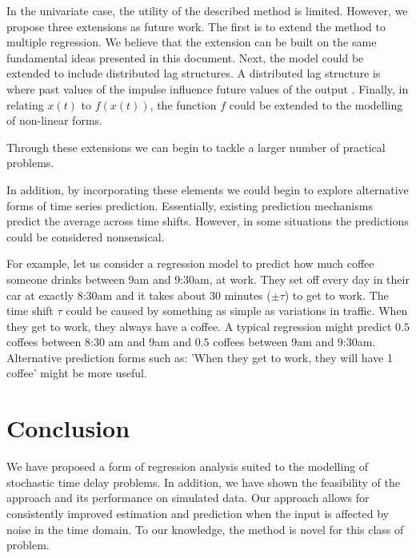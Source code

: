 \documentclass[11pt]{amsart}
\begin{document}
In the univariate case, the utility of the described method is limited. However, we propose three extensions as future work. The first is to extend the method to multiple regression. We believe that the extension can be built on the same fundamental ideas presented in this document. Next, the model could be extended to include distributed lag structures. A distributed lag structure is where past values of the impulse influence future values of the output \cite{almon}. Finally, in relating $x(t)$ to $f(x(t))$, the function $f$ could be extended to the modelling of non-linear forms.

Through these extensions we can begin to tackle a larger number of practical problems.

In addition, by incorporating these elements we could begin to explore alternative forms of time series prediction. Essentially, existing prediction mechanisms predict the average across time shifts. However, in some situations the predictions could be considered nonsensical.

For example, let us consider a regression model to predict how much coffee someone drinks between 9am and 9:30am, at work. They set off every day in their car at exactly 8:30am and it takes about 30 minutes ($\pm \tau$) to get to work. The time shift $\tau$ could be caused by something as simple as variations in traffic. When they get to work, they always have a coffee. A typical regression might predict $0.5$ coffees between 8:30 am and 9am and $0.5$ coffees between 9am and 9:30am. Alternative prediction forms such as: 'When they get to work, they will have 1 coffee' might be more useful.


\section{Conclusion}

We have proposed a form of regression analysis suited to the modelling of stochastic time delay problems. In addition, we have shown the feasibility of the approach and its performance on simulated data. Our approach allows for consistently improved estimation and prediction when the input is affected by noise in the time domain. To our knowledge, the method is novel for this class of problem.





\end{document}
